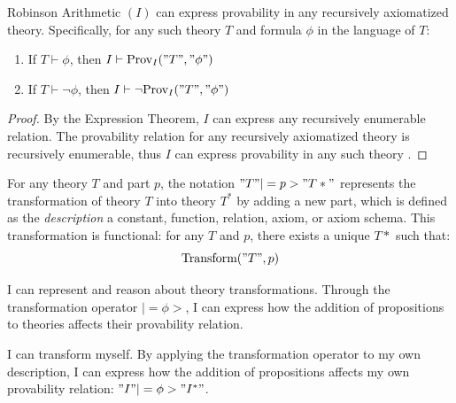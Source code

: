 \documentclass[runningheads]{llncs}
\begin{document}
\medskip

\begin{theorem}
    Robinson Arithmetic $(I)$ can express provability in any recursively axiomatized theory. Specifically, for any such theory $T$ and formula $\phi$ in the language of $T$:
    \begin{enumerate}
        \item If $T \vdash \phi$, then $I \vdash \text{Prov}_I("T","\phi")$
        \item If $T \vdash \neg \phi$, then $I \vdash \neg\text{Prov}_I("T","\phi")$
    \end{enumerate}
\end{theorem}

\begin{proof}
    By the Expression Theorem, $I$ can express any recursively enumerable relation. The provability relation for any recursively axiomatized theory is recursively enumerable, thus $I$ can express provability in any such theory \cite{Kleene1952}.
\end{proof}

\medskip

\begin{definition}
    For any theory $T$ and part $p$, the notation $"T" |=p> "T*"$ represents the transformation of theory $T$ into theory $T^*$ by adding a new part, which is defined as the \textit{description} a constant, function, relation, axiom, or axiom schema. This transformation is functional: for any $T$ and $p$, there exists a unique $T*$ such that:
    \begin{equation}
        \text{Transform}("T", p)
    \end{equation}
\end{definition}

\medskip

\begin{corollary}
    I can represent and reason about theory transformations. Through the transformation operator $|=\phi>$, I can express how the addition of propositions to theories affects their provability relation.
\end{corollary}

\medskip

\begin{corollary}
    I can transform myself. By applying the transformation operator to my own description, I can express how the addition of propositions affects my own provability relation: $"I" |=\phi> "I^*"$.
\end{corollary}
\end{document}

